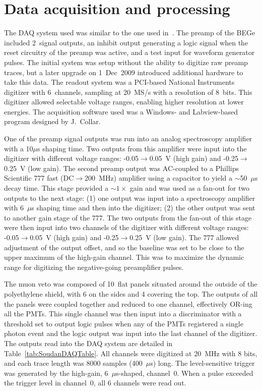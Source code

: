 	\section{Data acquisition and processing}
	\label{sec:BeGeDAQProcessing}
	
The DAQ system used was similar to the one used in~\cite{Aalseth:2008aa}.  The preamp of the BEGe included 2~signal outputs, an inhibit output generating a logic signal when the reset circuitry of the preamp was active, and a test input for waveform generator pulses.  The initial system was setup without the ability to digitize raw preamp traces, but a later upgrade on 1~Dec~2009 introduced additional hardware to take this data.  The readout system was a PCI-based National Instruments digitizer with 6~channels, sampling at 20~MS/s with a resolution of 8~bits.  This digitizer allowed selectable voltage ranges, enabling higher resolution at lower energies.  The acquisition software used was a Windows- and Labview-based program designed by J.~Collar.  

One of the preamp signal outputs was run into an analog spectroscopy amplifier with a 10$\mu$s shaping time.  Two outputs from this amplifier were input into the digitizer with different voltage ranges: -0.05$\to$0.05~V (high gain) and -0.25$\to$0.25~V (low gain).  The second preamp output was AC-coupled to a Phillips Scientific 777 fast (DC$\to$200~MHz) amplifier using a capacitor to yield a $\sim$50~$\mu$s decay time.  This stage provided a $\sim1\times$ gain and was used as a fan-out for two outputs to the next stage: (1) one output was input into a spectroscopy amplifier with 6~$\mu$s shaping time and then into the digitizer; (2) the other output was sent to another gain stage of the 777.  The two outputs from the fan-out of this stage were then input into two channels of the digitizer with different voltage ranges: -0.05$\to$0.05~V (high gain) and -0.25$\to$0.25~V (low gain).  The 777 allowed adjustment of the output offset, and so the baseline was set to be close to the upper maximum of the high-gain channel.  This was to maximize the dynamic range for digitizing the negative-going preamplifier pulses.  

The muon veto was composed of 10~flat panels situated around the outside of the polyethylene shield, with 6 on the sides and 4 covering the top.  The outputs of all the panels were coupled together and reduced to one channel, effectively OR-ing all the PMTs.  This single channel was then input into a discriminator with a threshold set to output logic pulses when any of the PMTs registered a single photon event and the logic output was input into the last channel of the digitizer.  The outputs read into the DAQ system are detailed in Table~\ref{tab:SoudanDAQTable}.  All channels were digitized at 20~MHz with 8 bits, and each trace length was 8000 samples (400~$\mu$s) long.  The level-sensitive trigger was generated by the high-gain, 6~$\mu$s-shaped, channel~0.  When a pulse exceeded the trigger level in channel~0, all 6 channels were read out.  

